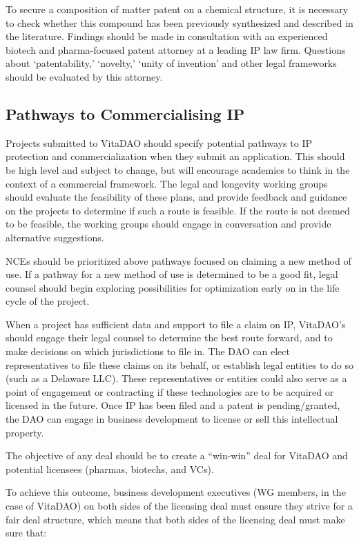 \documentclass[10pt,letterpaper]{article}
\begin{document}
To secure a composition of matter patent on a chemical structure, it is necessary to check whether this compound has been previously synthesized and described in the literature. Findings should be made in consultation with an experienced biotech and pharma-focused patent attorney at a leading IP law firm. Questions about ‘patentability,’ ‘novelty,’ ‘unity of invention’ and other legal frameworks should be evaluated by this attorney.

\subsection{Pathways to Commercialising IP}
Projects submitted to VitaDAO should specify potential pathways to IP protection and commercialization when they submit an application. This should be high level and subject to change, but will encourage academics to think in the context of a commercial framework. The legal and longevity working groups should evaluate the feasibility of these plans, and provide feedback and guidance on the projects to determine if such a route is feasible. If the route is not deemed to be feasible, the working groups should engage in conversation and provide alternative suggestions. 

NCEs should be prioritized above pathways focused on claiming a new method of use. If a pathway for a new method of use is determined to be a good fit, legal counsel should begin exploring possibilities for optimization early on in the life cycle of the project. 

When a project has sufficient data and support to file a claim on IP, VitaDAO’s should engage their legal counsel to determine the best route forward, and to make decisions on which jurisdictions to file in. The DAO can elect representatives to file these claims on its behalf, or establish legal entities to do so (such as a Delaware LLC). These representatives or entities could also serve as a point of engagement or contracting if these technologies are to be acquired or licensed in the future. Once IP has been filed and a patent is pending/granted, the DAO can engage in business development to license or sell this intellectual property.

The objective of any deal should be to create a “win-win” deal for VitaDAO and potential licensees (pharmas, biotechs, and VCs).

To achieve this outcome, business development executives (WG members, in the case of VitaDAO) on both sides of the licensing deal must ensure they strive for a fair deal structure, which means that both sides of the licensing deal must make sure that:
\end{document}
